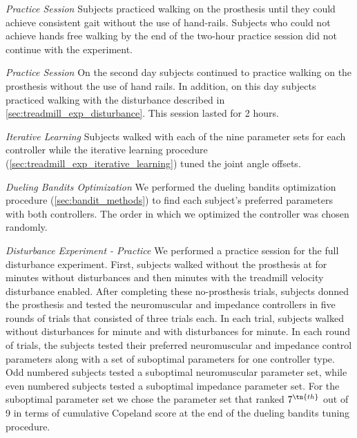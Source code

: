 \begin{days}
    \item\label{list:exp_day_1} \emph{Practice Session} Subjects practiced
    walking on the prosthesis until they could achieve consistent gait without
    the use of hand-rails. Subjects who could not achieve hands free walking by
    the end of the two-hour practice session did not continue with the
    experiment.

    \item\label{list:exp_day_2} \emph{Practice Session} On the second day
    subjects continued to practice walking on the prosthesis without the use of
    hand rails. In addition, on this day subjects practiced walking with the
    disturbance described in \cref{sec:treadmill_exp_disturbance}. This session
    lasted for 2 hours.

    \item\label{list:exp_day_3} \emph{Iterative Learning} Subjects walked with
    each of the nine parameter sets for each controller while the iterative
    learning procedure (\cref{sec:treadmill_exp_iterative_learning}) tuned the
    joint angle offsets. 

    \item\label{list:exp_day_4} \emph{Dueling Bandits Optimization} We performed
    the dueling bandits optimization procedure (\cref{sec:bandit_methods}) to
    find each subject's preferred parameters with both controllers. The order in
    which we optimized the controller was chosen randomly.

    \item\label{list:exp_day_5} \emph{Disturbance Experiment - Practice} We
    performed a practice session for the full disturbance experiment. First,
    subjects walked without the prosthesis at  for
    \unit[2]{minutes} without disturbances and then \unit[2]{minutes} with the
    treadmill velocity disturbance enabled. After completing these no-prosthesis
    trials, subjects donned the prosthesis and tested the neuromuscular and
    impedance controllers in five rounds of trials that consisted of three
    trials each. In each trial, subjects walked without disturbances for
    \unit[1]{minute} and with disturbances for \unit[1]{minute}. In each round
    of trials, the subjects tested their preferred neuromuscular and impedance
    control parameters along with a set of suboptimal parameters for one
    controller type. Odd numbered subjects tested a suboptimal neuromuscular
    parameter set, while even numbered subjects tested a suboptimal impedance
    parameter set. For the suboptimal parameter set we chose the parameter set
    that ranked $7^\tn{th}$ out of 9 in terms of cumulative Copeland score at
    the end of the dueling bandits tuning procedure.


\end{days}
